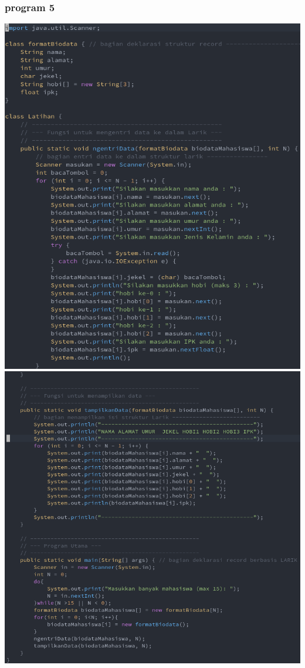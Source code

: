\documentclass[a4paper,12pt]{article}
\begin{document}
\subsubsection{program 5}
\begin{center}
    \includegraphics[scale=.5]{code08.png} 
    \newpage
    \includegraphics[scale=.5]{code09.png} 
\end{center}
\end{document}
